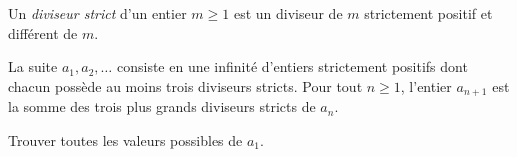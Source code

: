 Un \emph{diviseur strict} d'un entier $m \geqslant 1$ est un diviseur
de $m$ strictement positif et différent de $m$.

La suite $a_1, a_2, \ldots$ consiste en une infinité d'entiers
strictement positifs dont chacun possède au moins trois diviseurs
stricts. Pour tout $n \geqslant 1$, l'entier $a_{n+1}$ est la somme
des trois plus grands diviseurs stricts de $a_n$.

Trouver toutes les valeurs possibles de $a_1$.

